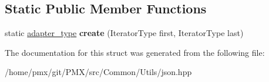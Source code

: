 \subsection*{Static Public Member Functions}
\begin{DoxyCompactItemize}
\item 
\mbox{\label{structnlohmann_1_1detail_1_1iterator__input__adapter__factory_3_01IteratorType_00_01enable__if__0e86378a778d78dd2284e92dc30f4902_aae2354d80ae95214a9da99c495003f6c}} 
static \hyperlink{classnlohmann_1_1detail_1_1wide__string__input__adapter}{adapter\+\_\+type} {\bfseries create} (Iterator\+Type first, Iterator\+Type last)
\end{DoxyCompactItemize}


The documentation for this struct was generated from the following file\+:\begin{DoxyCompactItemize}
\item 
/home/pmx/git/\+P\+M\+X/src/\+Common/\+Utils/json.\+hpp\end{DoxyCompactItemize}
